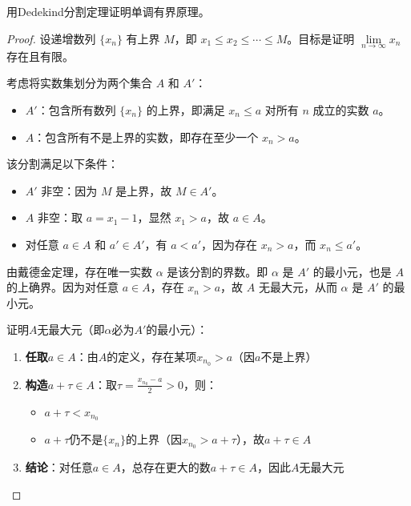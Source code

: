 \begin{problem}
    用Dedekind分割定理证明单调有界原理。
\end{problem}

    \begin{proof}
        设递增数列 $\{x_n\}$ 有上界 $M$，即 $x_1 \leq x_2 \leq \cdots \leq M$。目标是证明 $\lim\limits_{n \to \infty} x_n$ 存在且有限。
        
        考虑将实数集划分为两个集合 $A$ 和 $A'$：
        \begin{itemize}
            \item $A'$：包含所有数列 $\{x_n\}$ 的上界，即满足 $x_n \leq a$ 对所有 $n$ 成立的实数 $a$。
            \item $A$：包含所有不是上界的实数，即存在至少一个 $x_n > a$。
        \end{itemize}
        
        该分割满足以下条件：
        \begin{itemize}
            \item $A'$ 非空：因为 $M$ 是上界，故 $M \in A'$。
            \item $A$ 非空：取 $a = x_1 - 1$，显然 $x_1 > a$，故 $a \in A$。
            \item 对任意 $a \in A$ 和 $a' \in A'$，有 $a < a'$，因为存在 $x_n > a$，而 $x_n \leq a'$。
        \end{itemize}
        
        由戴德金定理，存在唯一实数 $\alpha$ 是该分割的界数。即 $\alpha$ 是 $A'$ 的最小元，也是 $A$ 的上确界。因为对任意 $a \in A$，存在 $x_n > a$，故 $A$ 无最大元，从而 $\alpha$ 是 $A'$ 的最小元。
        
            证明$A$无最大元（即$\alpha$必为$A'$的最小元）：
            \begin{enumerate}
                \item \textbf{任取$a \in A$}：由$A$的定义，存在某项$x_{n_0} > a$（因$a$不是上界）
                \item \textbf{构造$a + \tau \in A$}：取$\tau = \frac{x_{n_0} - a}{2} > 0$，则：
                \begin{itemize}
                    \item $a + \tau < x_{n_0}$
                    \item $a + \tau$仍不是$\{x_n\}$的上界（因$x_{n_0} > a + \tau$），故$a + \tau \in A$
                \end{itemize}
                \item \textbf{结论}：对任意$a \in A$，总存在更大的数$a + \tau \in A$，因此$A$无最大元
            \end{enumerate}
            

\end{proof}
